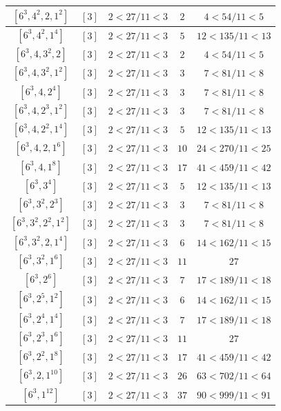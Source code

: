 \documentclass{article}%
\begin{document}
\begin{center}
\begin{longtable}{||c|c|c|c|c||}
$[6^{3}, 4^{2}, 2, 1^{2}]$ & $[3]$ & $2 < 27/11 < 3$ & $2$ & $4 < 54/11 < 5$ \\ \hline 
$[6^{3}, 4^{2}, 1^{4}]$ & $[3]$ & $2 < 27/11 < 3$ & $5$ & $12 < 135/11 < 13$ \\ \hline 
$[6^{3}, 4, 3^{2}, 2]$ & $[3]$ & $2 < 27/11 < 3$ & $2$ & $4 < 54/11 < 5$ \\ \hline 
$[6^{3}, 4, 3^{2}, 1^{2}]$ & $[3]$ & $2 < 27/11 < 3$ & $3$ & $7 < 81/11 < 8$ \\ \hline 
$[6^{3}, 4, 2^{4}]$ & $[3]$ & $2 < 27/11 < 3$ & $3$ & $7 < 81/11 < 8$ \\ \hline 
$[6^{3}, 4, 2^{3}, 1^{2}]$ & $[3]$ & $2 < 27/11 < 3$ & $3$ & $7 < 81/11 < 8$ \\ \hline 
$[6^{3}, 4, 2^{2}, 1^{4}]$ & $[3]$ & $2 < 27/11 < 3$ & $5$ & $12 < 135/11 < 13$ \\ \hline 
$[6^{3}, 4, 2, 1^{6}]$ & $[3]$ & $2 < 27/11 < 3$ & $10$ & $24 < 270/11 < 25$ \\ \hline 
$[6^{3}, 4, 1^{8}]$ & $[3]$ & $2 < 27/11 < 3$ & $17$ & $41 < 459/11 < 42$ \\ \hline 
$[6^{3}, 3^{4}]$ & $[3]$ & $2 < 27/11 < 3$ & $5$ & $12 < 135/11 < 13$ \\ \hline 
$[6^{3}, 3^{2}, 2^{3}]$ & $[3]$ & $2 < 27/11 < 3$ & $3$ & $7 < 81/11 < 8$ \\ \hline 
$[6^{3}, 3^{2}, 2^{2}, 1^{2}]$ & $[3]$ & $2 < 27/11 < 3$ & $3$ & $7 < 81/11 < 8$ \\ \hline 
$[6^{3}, 3^{2}, 2, 1^{4}]$ & $[3]$ & $2 < 27/11 < 3$ & $6$ & $14 < 162/11 < 15$ \\ \hline 
$[6^{3}, 3^{2}, 1^{6}]$ & $[3]$ & $2 < 27/11 < 3$ & $11$ & $27$ \\ \hline 
$[6^{3}, 2^{6}]$ & $[3]$ & $2 < 27/11 < 3$ & $7$ & $17 < 189/11 < 18$ \\ \hline 
$[6^{3}, 2^{5}, 1^{2}]$ & $[3]$ & $2 < 27/11 < 3$ & $6$ & $14 < 162/11 < 15$ \\ \hline 
$[6^{3}, 2^{4}, 1^{4}]$ & $[3]$ & $2 < 27/11 < 3$ & $7$ & $17 < 189/11 < 18$ \\ \hline 
$[6^{3}, 2^{3}, 1^{6}]$ & $[3]$ & $2 < 27/11 < 3$ & $11$ & $27$ \\ \hline 
$[6^{3}, 2^{2}, 1^{8}]$ & $[3]$ & $2 < 27/11 < 3$ & $17$ & $41 < 459/11 < 42$ \\ \hline 
$[6^{3}, 2, 1^{10}]$ & $[3]$ & $2 < 27/11 < 3$ & $26$ & $63 < 702/11 < 64$ \\ \hline 
$[6^{3}, 1^{12}]$ & $[3]$ & $2 < 27/11 < 3$ & $37$ & $90 < 999/11 < 91$ \\ \hline 

\end{longtable}
\end{center}
\end{document}

